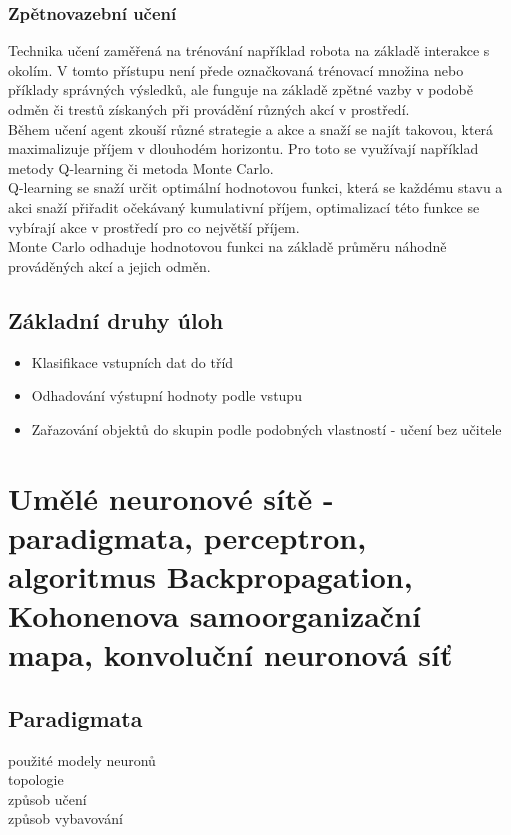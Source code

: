 \subsubsection{Zpětnovazební učení}
Technika učení zaměřená na trénování například robota na základě interakce s okolím. V tomto přístupu není přede označkovaná trénovací množina nebo příklady správných výsledků, ale funguje na základě zpětné vazby v podobě odměn či trestů získaných při provádění různých akcí v prostředí.\\
Během učení agent zkouší různé strategie a akce a snaží se najít takovou, která maximalizuje příjem v dlouhodém horizontu. Pro toto se využívají například metody Q-learning či metoda Monte Carlo.\\
Q-learning se snaží určit optimální hodnotovou funkci, která se každému stavu a akci snaží přiřadit očekávaný kumulativní příjem, optimalizací této funkce se vybírají akce v prostředí pro co největší příjem.\\
Monte Carlo odhaduje hodnotovou funkci na základě průměru náhodně prováděných akcí a jejich odměn.\\

\subsection{Základní druhy úloh}
\begin{itemize}
    \item Klasifikace vstupních dat do tříd
    \item Odhadování výstupní hodnoty podle vstupu
    \item Zařazování objektů do skupin podle podobných vlastností - učení bez učitele
\end{itemize}

\section{Umělé neuronové sítě - paradigmata, perceptron, algoritmus Backpropagation, Kohonenova samoorganizační mapa, konvoluční neuronová síť}
\subsection{Paradigmata}
použité modely neuronů\\
topologie\\
způsob učení\\
způsob vybavování\\

